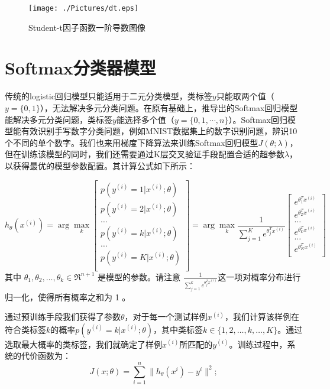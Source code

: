 \documentclass[oneside]{ZJUthesis}
\begin{document}
\begin{figure}[h]
\centering
\texttt{[image: ./Pictures/dt.eps]}
\caption{Student-t因子函数一阶导数图像}
\label{fig:dt}
\end{figure}


\section{Softmax分类器模型}
传统的logistic回归模型只能适用于二元分类模型，类标签$y$只能取两个值（$y=\{0,1\}$），无法解决多元分类问题。在原有基础上，推导出的Softmax回归模型能解决多元分类问题，类标签$y$能选择多个值（$y=\{0,1,\cdots,n\}$）\cite{Krizhevsky2012ImageNet}。Softmax回归模型能有效识别手写数字分类问题，例如MNIST数据集上的数字识别问题，辨识10个不同的单个数字。我们也来用梯度下降算法来训练Softmax回归模型$J(\theta;\lambda)$，但在训练该模型的同时，我们还需要通过K层交叉验证手段配置合适的超参数$\lambda$，以获得最优的模型参数配置。其计算公式如下所示：

\begin{equation}
\label{equ:softmax}
{h_\theta }({x^{(i)}}) =  \arg\max\limits_{k} \left[ {\begin{array}{*{20}{c}}
{p({y^{(i)}} = 1|{x^{(i)}};\theta )}\\
{p({y^{(i)}} = 2|{x^{(i)}};\theta )}\\
 \dots \\
{p({y^{(i)}} = k|{x^{(i)}};\theta )} \\
 \dots \\
{p({y^{(i)}} = K|{x^{(i)}};\theta )} \\
\end{array}} \right]=\arg\max\limits_{k} \frac{1}{\sum\limits_{j=1}^{K}{e^{\theta_j^Tx^{(i)}}}}\left[ {\begin{array}{*{20}{c}}
{e^{\theta_1^Tx^{(i)}}}\\
{e^{\theta_2^Tx^{(i)}}}\\
 \dots \\
{e^{\theta_k^Tx^{(i)}}}\\
 \dots \\
{e^{\theta_K^Tx^{(i)}}}\\
\end{array}} \right]
\end{equation}
其中 $\theta_1, \theta_2, \ldots, \theta_k \in \Re^{n+1}$ 是模型的参数。请注意 $\frac{1}{ \sum_{j=1}^{k}{e^{ \theta_j^T x^{(i)} }} } $这一项对概率分布进行归一化，使得所有概率之和为 1 。


通过预训练手段我们获得了参数$\theta$，对于每一个测试样例$x^{(i)}$，我们计算该样例在符合类标签$k$的概率$p({y^{(i)}} = k|{x^{(i)}};\theta )$，其中类标签$k \in \{1,2,\dots,k,\dots,K\}$。通过选取最大概率的类标签，我们就确定了样例$x^{(i)}$所匹配的$y^{(i)}$。训练过程中，系统的代价函数为：
\begin{equation}
	J(x;\theta)=\sum\limits_{i=1}^{n}{\|h_{\theta}(x^{i})-y^i\|^2};
\end{equation}
\end{document}
